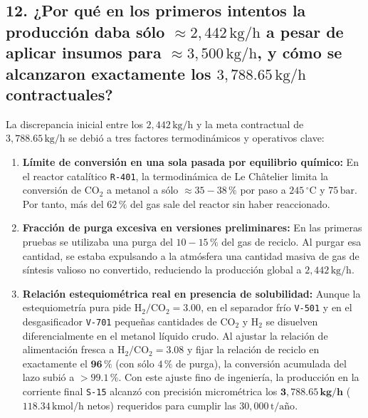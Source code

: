 \documentclass[11pt,a4paper]{article}
\begin{document}
\subsection{12. ¿Por qué en los primeros intentos la producción daba sólo \texorpdfstring{$\approx 2{,}442\,\text{kg/h}$}{2,442 kg/h} a pesar de aplicar insumos para \texorpdfstring{$\approx 3{,}500\,\text{kg/h}$}{3,500 kg/h}, y cómo se alcanzaron exactamente los \texorpdfstring{$3{,}788.65\,\text{kg/h}$}{3,750 kg/h} contractuales?}
La discrepancia inicial entre los $2{,}442\,\text{kg/h}$ y la meta contractual de $3{,}788.65\,\text{kg/h}$ se debió a tres factores termodinámicos y operativos clave:
\begin{enumerate}
    \item \textbf{Límite de conversión en una sola pasada por equilibrio químico:} En el reactor catalítico \texttt{R-401}, la termodinámica de Le Châtelier limita la conversión de $\text{CO}_2$ a metanol a sólo $\approx 35 - 38\,\%$ por paso a $245\,^\circ\text{C}$ y $75\,\text{bar}$. Por tanto, más del $62\,\%$ del gas sale del reactor sin haber reaccionado.
    \item \textbf{Fracción de purga excesiva en versiones preliminares:} En las primeras pruebas se utilizaba una purga del $10 - 15\,\%$ del gas de reciclo. Al purgar esa cantidad, se estaba expulsando a la atmósfera una cantidad masiva de gas de síntesis valioso no convertido, reduciendo la producción global a $2{,}442\,\text{kg/h}$.
    \item \textbf{Relación estequiométrica real en presencia de solubilidad:} Aunque la estequiometría pura pide $\text{H}_2/\text{CO}_2 = 3.00$, en el separador frío \texttt{V-501} y en el desgasificador \texttt{V-701} pequeñas cantidades de $\text{CO}_2$ y $\text{H}_2$ se disuelven diferencialmente en el metanol líquido crudo. Al ajustar la relación de alimentación fresca a $\text{H}_2/\text{CO}_2 = 3.08$ y fijar la relación de reciclo en exactamente el $\mathbf{96\,\%}$ (con sólo $4\,\%$ de purga), la conversión acumulada del lazo subió a $\mathbf{> 99.1\,\%}$. Con este ajuste fino de ingeniería, la producción en la corriente final \texttt{S-15} alcanzó con precisión micrométrica los $\mathbf{3{,}788.65\,\text{kg/h}}$ ($118.34\,\text{kmol/h}$ netos) requeridos para cumplir las $30{,}000\,\text{t/año}$.
\end{enumerate}
\end{document}
